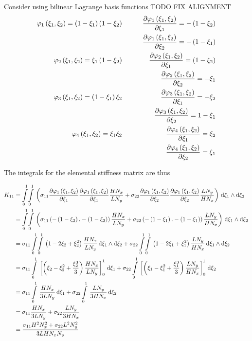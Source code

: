 Consider using bilinear Lagrange basis functions \ie TODO FIX
ALIGNMENT
\begin{equation}
  \begin{aligned}
       \varphi_{1} \left( \xi_{1},\xi_{2} \right)  =\left( 1-\xi_{1} \right)\left( 1-\xi_{2} \right)&\quad& \dfrac{\partial    \varphi_{1} \left( \xi_{1},\xi_{2} \right)  }{\partial \xi_{1}} =-\left( 1-\xi_{2} \right)\\ && \dfrac{\partial    \varphi_{1} \left( \xi_{1},\xi_{2} \right)  }{\partial \xi_{2}} =-\left( 1-\xi_{1} \right)
    \\    \varphi_{2} \left( \xi_{1},\xi_{2} \right)  =\xi_{1}\left( 1-\xi_{2} \right)&\qquad& \dfrac{\partial    \varphi_{2} \left( \xi_{1},\xi_{2} \right)  }{\partial \xi_{1}} =\left( 1-\xi_{2} \right)
    \\ && \dfrac{\partial    \varphi_{2} \left( \xi_{1},\xi_{2} \right)  }{\partial \xi_{2}} =-\xi_{1}
    \\    \varphi_{3} \left( \xi_{1},\xi_{2} \right)  =\left( 1-\xi_{1} \right)\xi_{2}&\qquad& \dfrac{\partial    \varphi_{3} \left( \xi_{1},\xi_{2} \right)  }{\partial \xi_{1}} =-\xi_{2}
    \\ && \dfrac{\partial    \varphi_{3} \left( \xi_{1},\xi_{2} \right)  }{\partial \xi_{2}} =1-\xi_{1}
    \\    \varphi_{4} \left( \xi_{1},\xi_{2} \right)  =\xi_{1}\xi_{2}&\qquad& \dfrac{\partial    \varphi_{4} \left( \xi_{1},\xi_{2} \right)  }{\partial \xi_{1}} =\xi_{2}
    \\ && \dfrac{\partial    \varphi_{4} \left( \xi_{1},\xi_{2} \right)  }{\partial \xi_{2}} =\xi_{1}
  \end{aligned}
\end{equation}

The integrals for the elemental stiffness matrix are thus

\begin{equation}
  \begin{aligned}
    K_{11}&=\giint{0}{1}{0}{1}{\pbrac{\sigma_{11}\delby{\lbfn{1}{\xi_{1},\xi_{2}}}{\xi_{1}}\delby{\lbfn{1}{\xi_{1},\xi_{2}}}{\xi_{1}}
        \dfrac{H N_{x}}{L N_{y}}+\sigma_{22}\delby{\lbfn{1}{\xi_{1},\xi_{2}}}{\xi_{2}}\delby{\lbfn{1}{\xi_{1},\xi_{2}}}{\xi_{2}}
        \dfrac{L N_{y}}{H N_{x}}}}{\xi_{1}}{\xi_{2}}\\
    &=\giint{0}{1}{0}{1}{\pbrac{\sigma_{11}\pbrac{-\pbrac{1-\xi_{2}}.-\pbrac{1-\xi_{2}}}\dfrac{H N_{x}}{L N_{y}}+
    \sigma_{22}\pbrac{-\pbrac{1-\xi_{1}}.-\pbrac{1-\xi_{1}}}\dfrac{L N_{y}}{H N_{x}}}}{\xi_{1}}{\xi_{2}} \\
    &=\sigma_{11}\giint{0}{1}{0}{1}{\pbrac{1-2\xi_{2}+\xi_{2}^{2}}\dfrac{H N_{x}}{L N_{y}}}{\xi_{1}}{\xi_{2}}+
    \sigma_{22}\giint{0}{1}{0}{1}{\pbrac{1-2\xi_{1}+\xi_{1}^{2}}\dfrac{L N_{y}}{H N_{x}}}{\xi_{1}}{\xi_{2}} \\
    &=\sigma_{11}\gint{0}{1}{\sqbrac{\pbrac{\xi_{2}-\xi_{2}^{2}+\dfrac{\xi_{2}^{3}}{3}}\dfrac{H N_{x}}{L N_{y}}}_{0}^{1}}{\xi_{1}}+
    \sigma_{22}\gint{0}{1}{\sqbrac{\pbrac{\xi_{1}-\xi_{1}^{2}+\dfrac{\xi_{1}^{3}}{3}}\dfrac{L N_{y}}{H N_{x}}}_{0}^{1}}{\xi_{2}} \\
    &=\sigma_{11}\gint{0}{1}{\dfrac{H N_{x}}{3 L N_{y}}}{\xi_{1}}+\sigma_{22}\gint{0}{1}{\dfrac{L N_{y}}{3 H N_{x}}}{\xi_{2}} \\
    &=\sigma_{11}\dfrac{H N_{x}}{3 L N_{y}}+\sigma_{22}\dfrac{L N_{y}}{3 H N_{x}} \\
    &=\dfrac{\sigma_{11}H^{2}N_{x}^{2}+\sigma_{22}L^{2}N_{y}^{2}}{3 L H N_{x} N_{y}}
  \end{aligned}
\end{equation}

